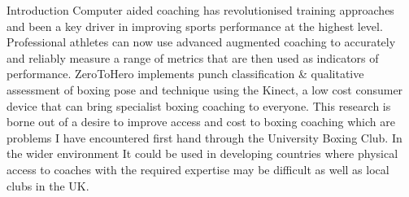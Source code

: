 \documentclass[ %
                    author={Liam O'Shea},
                supervisor={Dr. Sion Hannuna},
                     title={ZeroToHero},
                  subtitle={},
                    degree={Bsc},
                      year={2014} ]{poster}
\begin{document}

\begin{frame}{} 

\vfill

\begin{columns}[t]
    \begin{column}{0.900\linewidth}
    \begin{block}{\normalsize Introduction}
    \small Computer aided coaching has revolutionised training approaches and been a key driver
            in improving sports performance at the highest level. Professional athletes can now use
            advanced augmented coaching to accurately and reliably measure a range of metrics that
            are then used as indicators of performance. ZeroToHero implements punch classification \& qualitative assessment of boxing pose and technique using the Kinect, a low cost consumer device that can bring specialist boxing coaching to everyone.{\newline}
            This research is borne out of a desire to improve access and cost to boxing coaching which are problems I have encountered first hand through the University Boxing Club. In the wider environment It could be used in developing countries where physical access to coaches with the
            required expertise may be difficult as well as local clubs in the UK.

    \end{block}
    \end{column}
\end{columns}

\vfill


\end{frame}
\end{document}
